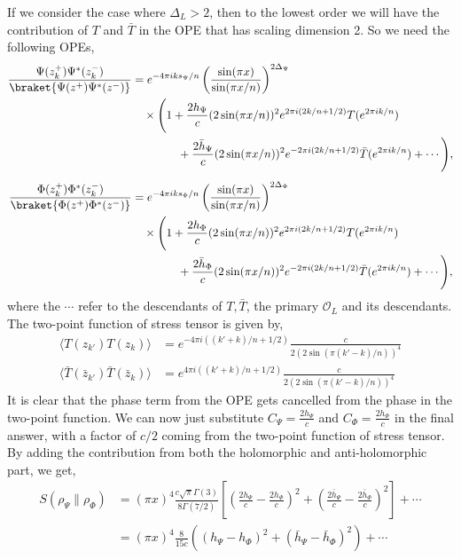 \documentclass[11pt]{article}
\newcommand{\mO}{\mathcal{O}}
\newcommand{\nn}{\nonumber}
\newcommand{\lb}{\left(}
\newcommand{\rb}{\right)}
\begin{document}
If we consider the case where $\Delta_L>2$, then to the lowest order we will have the contribution of $T$ and $\bar T$ in the OPE that has scaling dimension 2. So we need the following OPEs,
\begin{align}
\frac{\Psi(z_{k}^{+})\Psi^*(z_{k}^{-})}
     {\braket{\Psi(z^+)\Psi^*(z^-)}}
&=
e^{-4\pi i k s_{\Psi}/n}
\left(
\frac{\sin(\pi x)}{\sin(\pi x/n)}
\right)^{2\Delta_{\Psi}}
\nonumber\\
&\quad\times
\Bigg(
1
+\frac{2h_\Psi}{c}(2\sin(\pi x/n))^{2}
 e^{2\pi i(2k/n+1/2)}
 T(e^{2\pi i k/n})
\nonumber\\
&\qquad \qquad
+\frac{2\bar h_\Psi}{c}(2\sin(\pi x/n))^{2}
 e^{-2\pi i(2k/n+1/2)}
 \bar T(e^{2\pi i k/n})
+\cdots
\Bigg),
\\[1ex]
\frac{\Phi(z_{k}^{+})\Phi^*(z_{k}^{-})}
     {\braket{\Phi(z^+)\Phi^*(z^-)}}
&=
e^{-4\pi i k s_{\Phi}/n}
\left(
\frac{\sin(\pi x)}{\sin(\pi x/n)}
\right)^{2\Delta_{\Phi}}
\nonumber\\
&\quad\times
\Bigg(
1
+\frac{2h_\Phi}{c}(2\sin(\pi x/n))^{2}
 e^{2\pi i(2k/n+1/2)}
 T(e^{2\pi i k/n})
\nonumber\\
&\qquad \qquad
+\frac{2\bar h_\Phi}{c}(2\sin(\pi x/n))^{2}
 e^{-2\pi i(2k/n+1/2)}
 \bar T(e^{2\pi i k/n})
+\cdots
\Bigg),
\end{align}
where the $\cdots$ refer to the descendants of $T,\bar T$, the primary $\mO_L$ and its descendants. 
The two-point function of stress tensor is given by,
\begin{align}
    \langle T (z_{k'})T(z_k) \rangle &= e^{-4\pi i ((k'+k)/n + 1/2)}\frac{c}{2(2\sin(\pi (k'-k)/n))^4} \\
    \langle \bar T (\bar z_{k'})\bar T(\bar z_k) \rangle &= e^{4\pi i ((k'+k)/n + 1/2)}\frac{c}{2(2\sin(\pi (k'-k)/n))^4} 
\end{align}
It is clear that the phase term from the OPE gets cancelled from the phase in the two-point function. We can now just substitute $C_\Psi = \frac{2h_\Psi}{c}$ and $C_\Phi = \frac{2h_\Phi}{c}$ in the final answer, with a factor of $c/2$ coming from the two-point function of stress tensor. By adding the contribution from both the holomorphic and anti-holomorphic part, we get,
\begin{align}
    S(\rho_\Psi \| \rho_\Phi) &= (\pi x)^4 \frac{c\sqrt{\pi}\Gamma(3)}{8\Gamma(7/2)}\left[\lb \frac{2h_\Psi}{c}- \frac{2h_\Phi}{c} \rb ^2 + \lb \frac{2\bar h_\Psi}{c}- \frac{2\bar h_\Phi}{c} \rb ^2  \right]+\cdots \nn\\
    &= (\pi x)^4\frac{8}{15c}\lb (h_\Psi - h_\Phi)^2 + (\bar h_\Psi - \bar h_\Phi)^2 \rb + \cdots
\end{align}
\end{document}

